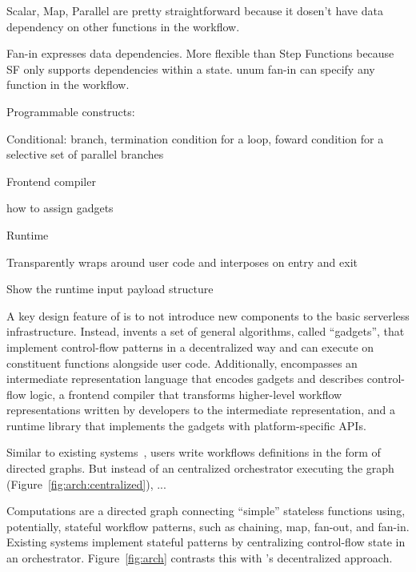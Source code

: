 Scalar, Map, Parallel are pretty straightforward because it dosen't have data
dependency on other functions in the workflow.

Fan-in expresses data dependencies. More flexible than Step Functions because
SF only supports dependencies within a state. unum fan-in can specify any
function in the workflow.

Programmable constructs: 

Conditional: branch, termination condition for a loop, foward condition for a
selective set of parallel branches



Frontend compiler%

how to assign gadgets

Runtime%

Transparently wraps around user code and interposes on entry and exit

Show the runtime input payload structure








A key design feature of \name{} is to not introduce new components to the
basic serverless infrastructure. Instead, \name{} invents a set of general
algorithms, called ``gadgets'', that implement control-flow patterns in a
decentralized way and can execute on constituent functions alongside user
code. Additionally, \name{} encompasses an intermediate representation
language that encodes gadgets and describes control-flow logic, a frontend
compiler that transforms higher-level workflow representations written by
developers to the intermediate representation, and a runtime library that
implements the gadgets with platform-specific APIs.

Similar to existing systems~\cite{aws-step-functions, google-workflows,
google-cloud-composer, gg}, \name{} users write workflows definitions in the
form of directed graphs. But instead of an centralized orchestrator executing
the graph (Figure~\ref{fig:arch:centralized}), \name{} ...



Computations are a directed graph connecting ``simple'' stateless functions
using, potentially, stateful workflow patterns, such as chaining, map, fan-out,
and fan-in. Existing systems implement stateful patterns by centralizing
control-flow state in an orchestrator. Figure~\ref{fig:arch} contrasts this with
\name{}'s decentralized approach.

